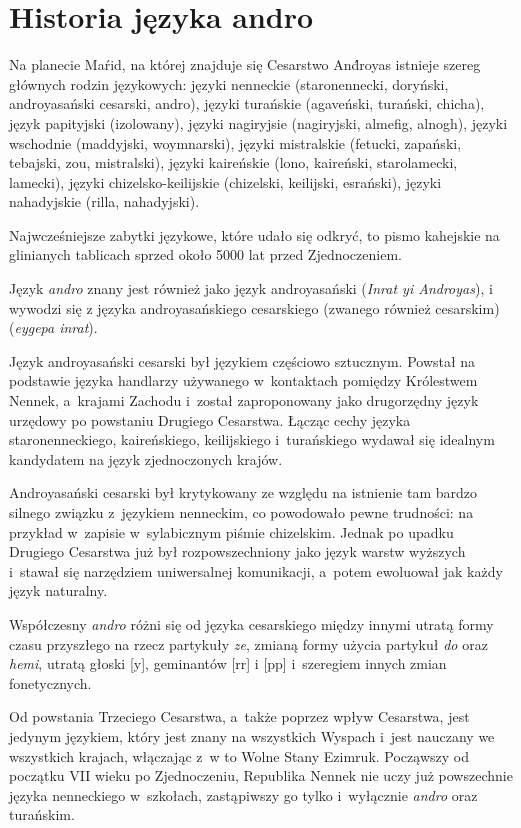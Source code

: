 \section[Historia]{Historia języka andro}

\begin{spacing}{1.1}
Na planecie Maŕid, na której znajduje się Cesarstwo And́royas istnieje szereg
głównych rodzin językowych: języki nenneckie (staronennecki, doryński,
androyasański cesarski, andro), języki turańskie (agaveński, turański, chicha),
język papityjski (izolowany), języki nagiryjsie (nagiryjski, almefig, alnogh),
języki wschodnie (maddyjski, woymnarski), języki mistralskie (fetucki, zapański,
tebajski, zou, mistralski), języki kaireńskie (lono, kaireński, starolamecki,
lamecki), języki chi\-zelsko-keilijskie (chizelski, keilijski, esrański), języki
nahadyjskie (rilla, nahadyjski).

Najwcześniejsze zabytki językowe, które udało się odkryć, to pismo kahejskie na 
glinianych tablicach sprzed około 5000 lat przed Zjednoczeniem.

Język \emph{andro} znany jest również jako język androyasański (\emph{Inrat yi
Androyas}), i wywodzi się z języka androyasańskiego cesarskiego (zwanego również
cesarskim) (\emph{eygepa inrat}).

Język androyasański cesarski był językiem częściowo sztucznym. Powstał na
podstawie języka handlarzy używanego w~kontaktach pomiędzy Królestwem Nennek,
a~krajami Zachodu i~został zaproponowany jako drugorzędny język urzędowy po
powstaniu Drugiego Cesarstwa. Łącząc cechy języka staronenneckiego,
kaireńskiego, keilijskiego i~turańskiego wydawał się idealnym kandydatem na
język zjednoczonych krajów.

Androyasański cesarski był krytykowany ze względu na istnienie tam bardzo 
silnego związku z~językiem nenneckim, co powodowało pewne trudności: na przykład 
w~zapisie w~sylabicznym piśmie chizelskim. Jednak po upadku Drugiego Cesarstwa 
już był rozpowszechniony jako język warstw wyższych i~stawał się narzędziem 
uniwersalnej komunikacji, a~potem ewoluował jak każdy język naturalny.

Współczesny \emph{andro} różni się od języka cesarskiego między innymi utratą
formy czasu przyszłego na rzecz partykuły \emph{ze}, zmianą formy użycia
partykuł \emph{do} oraz \emph{hemi}, utratą głoski [y], geminantów [rr] i [pp]
i~szeregiem innych zmian fonetycznych.

Od powstania Trzeciego Cesarstwa, a~także poprzez wpływ Cesarstwa, jest jedynym
językiem, który jest znany na wszystkich Wyspach i~jest nauczany we wszystkich
krajach, włączając z~w to Wolne Stany Ezimruk. Począwszy od początku VII wieku
po Zjednoczeniu, Republika Nennek nie uczy już powszechnie języka nenneckiego
w~szkołach, zastąpiwszy go tylko i~wyłącznie \emph{andro} oraz turańskim.


\end{spacing}
